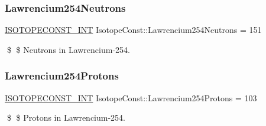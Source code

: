 \subsubsection{\texorpdfstring{Lawrencium254\+Neutrons}{Lawrencium254Neutrons}}
{\footnotesize\ttfamily \mbox{\hyperlink{group___isotope_const-_macros_ga5f18360b3e99483a35c32d789e62621c}{I\+S\+O\+T\+O\+P\+E\+C\+O\+N\+S\+T\+\_\+\+I\+NT}} Isotope\+Const\+::\+Lawrencium254\+Neutrons = 151}

\$ \$ Neutrons in Lawrencium-\/254. \mbox{\label{group___isotope_const-_lawrencium-_lr254_ga8e3121700f778b56a3f4c00a3adf3297}} 
\subsubsection{\texorpdfstring{Lawrencium254\+Protons}{Lawrencium254Protons}}
{\footnotesize\ttfamily \mbox{\hyperlink{group___isotope_const-_macros_ga5f18360b3e99483a35c32d789e62621c}{I\+S\+O\+T\+O\+P\+E\+C\+O\+N\+S\+T\+\_\+\+I\+NT}} Isotope\+Const\+::\+Lawrencium254\+Protons = 103}

\$ \$ Protons in Lawrencium-\/254. 